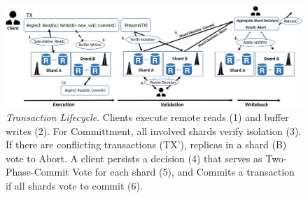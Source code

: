 \begin{figure}[!th]
\begin{center}
\includegraphics[width= \textwidth]{./figures/Archi.png}
\end{center}
\caption{{\em Transaction Lifecycle}. Clients execute remote reads (1) and buffer writes (2). For Committment, all involved shards verify isolation (3). If there are conflicting transactions (TX'), replicas in a shard (B) vote to Abort. A client persists a decision (4) that serves as Two-Phase-Commit Vote for each shard (5), and Commits a transaction if all shards vote to commit (6).}
\label{fig:Figure1}
\end{figure}
